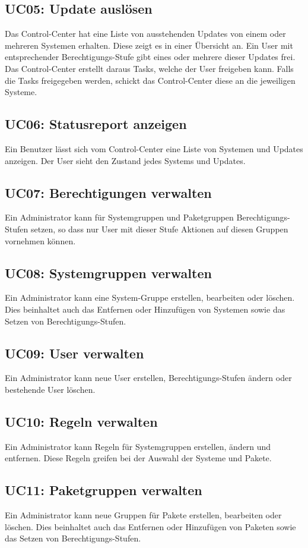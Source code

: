 \subsection*{UC05: Update auslösen}
\label{sec:uc_05}

Das Control-Center hat eine Liste von ausstehenden Updates von einem oder mehreren Systemen erhalten. Diese zeigt es in einer Übersicht an. Ein User mit entsprechender Berechtigungs-Stufe gibt eines oder mehrere dieser Updates frei. Das Control-Center erstellt daraus Tasks, welche der User freigeben kann. Falls die Tasks freigegeben werden, schickt das Control-Center diese an die jeweiligen Systeme.

\subsection*{UC06: Statusreport anzeigen}
\label{sec:uc_06}

Ein Benutzer lässt sich vom Control-Center eine Liste von Systemen und Updates anzeigen. Der User sieht den Zustand jedes Systems und Updates.

\subsection*{UC07: Berechtigungen verwalten}
\label{sec:uc_07}

Ein Administrator kann für Systemgruppen und Paketgruppen Berechtigungs-Stufen setzen, so dass nur User mit dieser Stufe Aktionen auf diesen Gruppen vornehmen können.

\subsection*{UC08: Systemgruppen verwalten}
\label{sec:uc_08}

Ein Administrator kann eine System-Gruppe erstellen, bearbeiten oder löschen. Dies beinhaltet auch das Entfernen oder Hinzufügen von Systemen sowie das Setzen von Berechtigungs-Stufen.

\subsection*{UC09: User verwalten}
\label{sec:uc_09}

Ein Administrator kann neue User erstellen, Berechtigungs-Stufen ändern oder bestehende User löschen.

\subsection*{UC10: Regeln verwalten}
\label{sec:uc_10}

Ein Administrator kann Regeln für Systemgruppen erstellen, ändern und entfernen. Diese Regeln greifen bei der Auswahl der Systeme und Pakete.

\subsection*{UC11: Paketgruppen verwalten}
\label{sec:uc_11}

Ein Administrator kann neue Gruppen für Pakete erstellen, bearbeiten oder löschen. Dies beinhaltet auch das Entfernen oder Hinzufügen von Paketen sowie das Setzen von Berechtigungs-Stufen.
